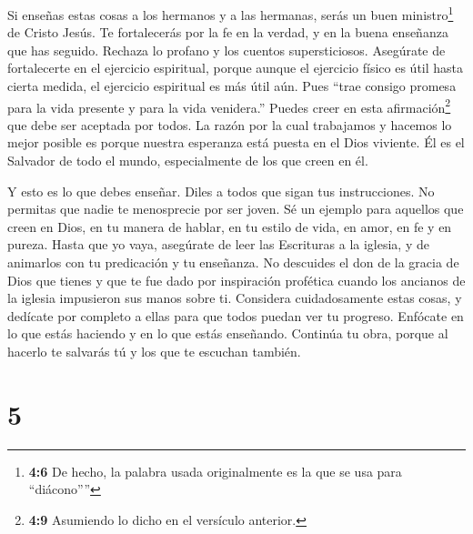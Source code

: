  Si enseñas estas cosas a los hermanos y a las hermanas,
serás un buen ministro\footnote{\textbf{4:6} De hecho, la palabra usada
  originalmente es la que se usa para ``diácono''''} de Cristo Jesús. Te
fortalecerás por la fe en la verdad, y en la buena enseñanza que has
seguido.  Rechaza lo profano y los cuentos supersticiosos.
Asegúrate de fortalecerte en el ejercicio espiritual, 
porque aunque el ejercicio físico es útil hasta cierta medida, el
ejercicio espiritual es más útil aún. Pues ``trae consigo promesa para
la vida presente y para la vida venidera.''  Puedes creer en
esta afirmación\footnote{\textbf{4:9} Asumiendo lo dicho en el versículo
  anterior.} que debe ser aceptada por todos.  La razón por
la cual trabajamos y hacemos lo mejor posible es porque nuestra
esperanza está puesta en el Dios viviente. Él es el Salvador de todo el
mundo, especialmente de los que creen en él.

 Y esto es lo que debes enseñar. Diles a todos que sigan
tus instrucciones.  No permitas que nadie te menosprecie
por ser joven. Sé un ejemplo para aquellos que creen en Dios, en tu
manera de hablar, en tu estilo de vida, en amor, en fe y en pureza.
 Hasta que yo vaya, asegúrate de leer las Escrituras a la
iglesia, y de animarlos con tu predicación y tu enseñanza. 
No descuides el don de la gracia de Dios que tienes y que te fue dado
por inspiración profética cuando los ancianos de la iglesia impusieron
sus manos sobre ti.  Considera cuidadosamente estas cosas,
y dedícate por completo a ellas para que todos puedan ver tu progreso.
 Enfócate en lo que estás haciendo y en lo que estás
enseñando. Continúa tu obra, porque al hacerlo te salvarás tú y los que
te escuchan también.

\hypertarget{section-4}{%
\section{5}\label{section-4}}

